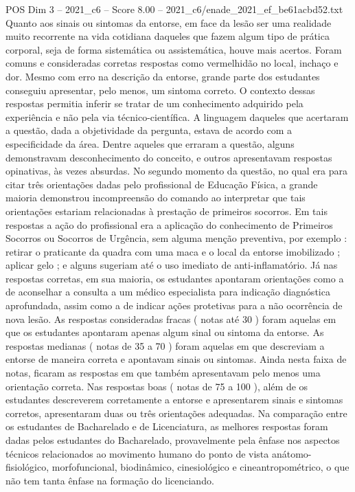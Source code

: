 \begin{textsample}{POS Dim 3 – 2021\_c6 – Score 8.00 – 2021\_c6/enade\_2021\_ef\_be61acbd52.txt}
Quanto aos sinais ou sintomas da entorse, em face da lesão ser uma realidade muito recorrente na vida cotidiana daqueles que fazem algum tipo de prática corporal, seja de forma sistemática ou assistemática, houve mais acertos.
Foram comuns e consideradas corretas respostas como vermelhidão no local, inchaço e dor.
Mesmo com erro na descrição da entorse, grande parte dos estudantes conseguiu apresentar, pelo menos, um sintoma correto.
O contexto dessas respostas permitia inferir se tratar de um conhecimento adquirido pela experiência e não pela via técnico-científica.
A linguagem daqueles que acertaram a questão, dada a objetividade da pergunta, estava de acordo com a especificidade da área.
Dentre aqueles que erraram a questão, alguns demonstravam desconhecimento do conceito, e outros apresentavam respostas opinativas, às vezes absurdas.
No segundo momento da questão, no qual era para citar três orientações dadas pelo profissional de Educação Física, a grande maioria demonstrou incompreensão do comando ao interpretar que tais orientações estariam relacionadas à prestação de primeiros socorros.
Em tais respostas a ação do profissional era a aplicação do conhecimento de Primeiros Socorros ou Socorros de Urgência, sem alguma menção preventiva, por exemplo : retirar o praticante da quadra com uma maca e o local da entorse imobilizado ; aplicar gelo ; e alguns sugeriam até o uso imediato de anti-inflamatório.
Já nas respostas corretas, em sua maioria, os estudantes apontaram orientações como a de aconselhar a consulta a um médico especialista para indicação diagnóstica aprofundada, assim como a de indicar ações protetivas para a não ocorrência de nova lesão.
As respostas consideradas fracas ( notas até 30 ) foram aquelas em que os estudantes apontaram apenas algum sinal ou sintoma da entorse.
As respostas medianas ( notas de 35 a 70 ) foram aquelas em que descreviam a entorse de maneira correta e apontavam sinais ou sintomas.
Ainda nesta faixa de notas, ficaram as respostas em que também apresentavam pelo menos uma orientação correta.
Nas respostas boas ( notas de 75 a 100 ), além de os estudantes descreverem corretamente a entorse e apresentarem sinais e sintomas corretos, apresentaram duas ou três orientações adequadas.
Na comparação entre os estudantes de Bacharelado e de Licenciatura, as melhores respostas foram dadas pelos estudantes do Bacharelado, provavelmente pela ênfase nos aspectos técnicos relacionados ao movimento humano do ponto de vista anátomo-fisiológico, morfofuncional, biodinâmico, cinesiológico e cineantropométrico, o que não tem tanta ênfase na formação do licenciando.

\end{textsample}
